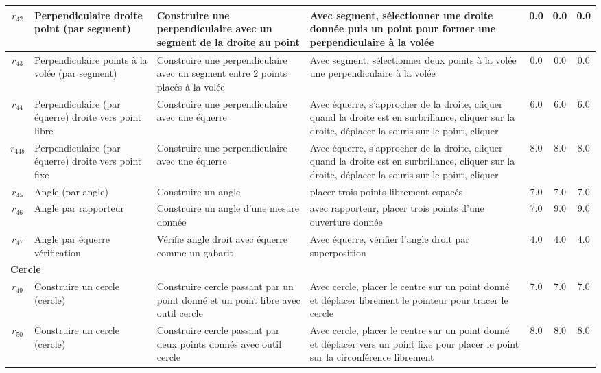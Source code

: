 \begin{longtable}{|c|p{3cm}|p{4cm}|p{4cm}|c|c|c|}
$r_{42}$\label{op_perp_sgt_dte_pt} & Perpendiculaire droite point (par segment) & Construire une perpendiculaire avec un segment de la droite au point  & Avec segment,  sélectionner  une droite donnée puis un point pour former une perpendiculaire à la volée & 0.0 & 0.0 & 0.0 \\ \hline
$r_{43}$\label{op_perp_sgt_pt_lib} & Perpendiculaire points à la volée (par segment) & Construire une perpendiculaire avec un segment entre 2 points placés à la volée & Avec segment,  sélectionner  deux points à la volée une perpendiculaire à la volée & 0.0 & 0.0 & 0.0 \\ \hline
$r_{44}$\label{op_perp_equer_dte_pt_libre} & Perpendiculaire (par équerre) droite vers point libre & Construire une perpendiculaire avec une équerre & Avec équerre, s'approcher de la droite, cliquer quand la droite est en surbrillance, cliquer sur la droite, déplacer la souris sur le point, cliquer & 6.0 & 6.0 & 6.0 \\ \hline
$r_{44b}$\label{op_perp_equer_dte_pt_fixe} & Perpendiculaire (par équerre) droite vers point fixe & Construire une perpendiculaire avec une équerre & Avec équerre, s'approcher de la droite, cliquer quand la droite est en surbrillance, cliquer sur la droite, déplacer la souris sur le point, cliquer & 8.0 & 8.0 & 8.0 \\ \hline
$r_{45}$\label{op_angle} & Angle (par angle) & Construire un angle & placer trois points librement espacés & 7.0 & 7.0 & 7.0 \\ \hline
$r_{46}$\label{op_angle_rapporteur} & Angle par rapporteur & Construire un angle d’une mesure donnée & avec rapporteur, placer trois points d’une ouverture donnée & 7.0 & 9.0 & 9.0 \\ \hline
$r_{47}$\label{op_angle_equerre} & Angle par équerre vérification & Vérifie angle droit avec équerre comme un gabarit & Avec équerre, vérifier l'angle droit par superposition & 4.0 & 4.0 & 4.0 \\ \hline
\multicolumn{7}{|l|}{\textbf{Cercle}} \\ \hline
$r_{49}$\label{op_cercle_pt_const_pt_vol_out_cercle} & Construire un cercle (cercle) & Construire cercle passant par un point donné et un point libre avec outil cercle & Avec cercle, placer le centre sur un point donné et déplacer librement le pointeur pour tracer le cercle & 7.0 & 7.0 & 7.0 \\ \hline
$r_{50}$\label{op_cercle_pts_const_out_cercle} & Construire un cercle (cercle) & Construire cercle passant par deux points donnés avec outil cercle & Avec cercle, placer le centre sur un point donné et déplacer vers un point fixe pour placer le point sur la circonférence librement & 8.0 & 8.0 & 8.0 \\ \hline

\end{longtable}
